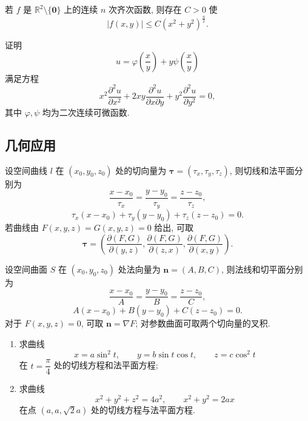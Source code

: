 \documentclass[../../数学分析培优讲义.tex]{subfiles}
\begin{document}
\begin{proposition}
若 $f$ 是 $\mathbb{R}^2\setminus\{\bm{0}\}$ 上的连续 $n$ 次齐次函数, 则存在 $C>0$ 使
\[
    |f(x,y)|\leq C(x^2+y^2)^{\frac{n}{2}}.
\]
\end{proposition}

\begin{example}
证明
\[
    u=\varphi\left(\dfrac{x}{y}\right)+y\psi\left(\dfrac{x}{y}\right)
\]
满足方程
\[
    x^2\dfrac{\partial^2u}{\partial x^2}
    +2xy\dfrac{\partial^2u}{\partial x\partial y}
    +y^2\dfrac{\partial^2u}{\partial y^2}=0,
\]
其中 $\varphi,\psi$ 均为二次连续可微函数.
\end{example}
\exampleblank



\subsection{几何应用}

\begin{proposition}[\markstar]
设空间曲线 $l$ 在 $(x_0,y_0,z_0)$ 处的切向量为 $\bm\tau=(\tau_x,\tau_y,\tau_z)$, 则切线和法平面分别为
\[
    \dfrac{x-x_0}{\tau_x}=\dfrac{y-y_0}{\tau_y}=\dfrac{z-z_0}{\tau_z},
\]
\[
    \tau_x(x-x_0)+\tau_y(y-y_0)+\tau_z(z-z_0)=0.
\]
若曲线由 $F(x,y,z)=G(x,y,z)=0$ 给出, 可取
\[
    \bm\tau=
    \left(
    \dfrac{\partial(F,G)}{\partial(y,z)},
    \dfrac{\partial(F,G)}{\partial(z,x)},
    \dfrac{\partial(F,G)}{\partial(x,y)}
    \right).
\]
\end{proposition}

\begin{proposition}[\markstar]
设空间曲面 $S$ 在 $(x_0,y_0,z_0)$ 处法向量为 $\bm n=(A,B,C)$, 则法线和切平面分别为
\[
    \dfrac{x-x_0}{A}=\dfrac{y-y_0}{B}=\dfrac{z-z_0}{C},
\]
\[
    A(x-x_0)+B(y-y_0)+C(z-z_0)=0.
\]
对于 $F(x,y,z)=0$, 可取 $\bm n=\nabla F$; 对参数曲面可取两个切向量的叉积.
\end{proposition}

\begin{example}
\begin{enumerate}[label=(\arabic*)]
    \item 求曲线
    \[
        x=a\sin^2t,\qquad y=b\sin t\cos t,\qquad z=c\cos^2t
    \]
    在 $t=\dfrac{\pi}{4}$ 处的切线方程和法平面方程;
    \item 求曲线
    \[
        x^2+y^2+z^2=4a^2,\qquad x^2+y^2=2ax
    \]
    在点 $(a,a,\sqrt2a)$ 处的切线方程与法平面方程.
\end{enumerate}
\end{example}
\exampleblank
\end{document}
